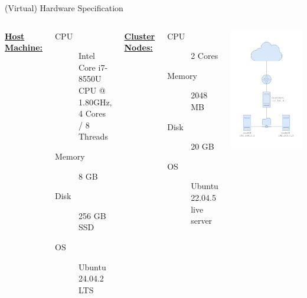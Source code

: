 \documentclass[10pt]{beamer}
\begin{document}
\begin{frame}{(Virtual) Hardware Specification}
  \begin{columns}
    \hspace{0.5cm}
    {\footnotesize\textbf{\underline{Host Machine:}}
    \begin{description}
      \item[CPU] Intel Core i7-8550U CPU @ 1.80GHz, \\4 Cores / 8 Threads
      \item[Memory] 8 GB
      \item[Disk] 256 GB SSD
      \item[OS] Ubuntu 24.04.2 LTS
    \end{description}

    \textbf{\underline{Cluster Nodes:}}
    \begin{description}
      \item[CPU] 2 Cores
      \item[Memory] 2048 MB
      \item[Disk] 20 GB
      \item[OS] Ubuntu 22.04.5 live server
    \end{description}}
    \includegraphics[width=0.9\linewidth]{images/diagram.pdf}
  \end{columns}
\end{frame}
\end{document}
